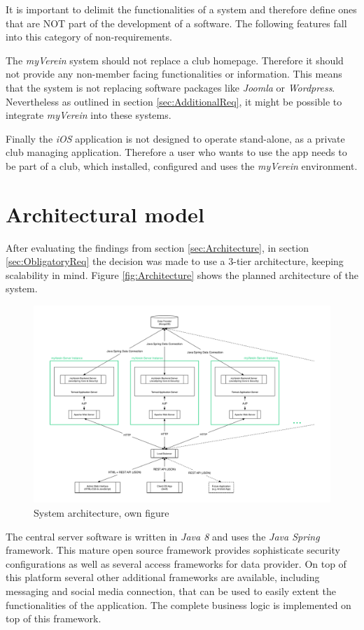 It is important to delimit the functionalities of a system and therefore define ones that are NOT part of the development of a software. The following features fall into this category of non-requirements.

The \emph{myVerein} system should not replace a club homepage. Therefore it should not provide any non-member facing functionalities or information. This means that the system is not replacing software packages like \emph{Joomla} or \emph{Wordpress}. Nevertheless as outlined in section \vref{sec:AdditionalReq}, it might be possible to integrate \emph{myVerein} into these systems.

Finally the \emph{iOS} application is not designed to operate stand-alone, as a private club managing application. Therefore a user who wants to use the app needs to be part of a club, which installed, configured and uses the \emph{myVerein} environment.

\section{Architectural model}
\label{sec:ArchitecturalModel}
After evaluating the findings from section \vref{sec:Architecture}, in section \vref{sec:ObligatoryReq} the decision was made to use a 3-tier architecture, keeping scalability in mind. Figure \vref{fig:Architecture} shows the planned architecture of the system. 

\begin{figure}[h]
  	\centering
  	\includegraphics[width=0.95\linewidth]{./images/architecture.png}
  	\caption{System architecture, own figure}
	\label{fig:Architecture}
\end{figure}

The central server software is written in \emph{Java 8} and uses the \emph{Java Spring} framework. This mature open source framework provides sophisticate security configurations as well as several access frameworks for data provider. On top of this platform several other additional frameworks are available, including messaging and social media connection, that can be used to easily extent the functionalities of the application. The complete business logic is implemented on top of this framework.

